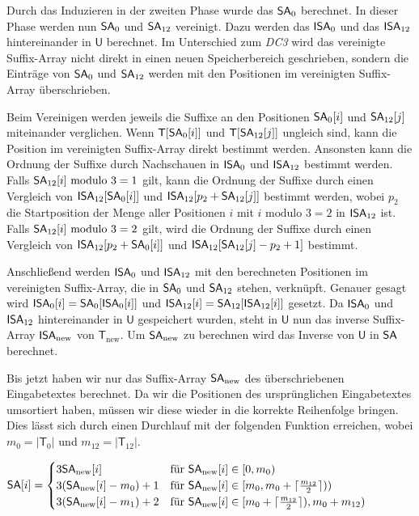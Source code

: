 Durch das Induzieren in der zweiten Phase wurde das $\sa_0$ berechnet. In dieser Phase werden nun $\sa_0$ und $\sa_{12}$ vereinigt. Dazu werden das $\isa_0$ und das $\isa_{12}$ hintereinander in $\mathsf{U}$ berechnet. Im Unterschied zum \emph{DC3} wird das vereinigte Suffix-Array nicht direkt in einen neuen Speicherbereich geschrieben, sondern die Einträge von $\sa_0$ und $\sa_{12}$ werden mit den Positionen im vereinigten Suffix-Array überschrieben. \par
Beim Vereinigen werden jeweils die Suffixe an den Positionen $\sa_0[i]$ und $\sa_{12}[j]$ miteinander verglichen. Wenn $\mathsf{T}[\sa_0[i]]$ und $\mathsf{T}[\sa_{12}[j]]$ ungleich sind, kann die Position im vereinigten Suffix-Array direkt bestimmt werden. Ansonsten kann die Ordnung der Suffixe durch Nachschauen in $\isa_0$ und $\isa_{12}$ bestimmt werden. Falls $\sa_{12}[i] \text{ modulo } 3 = 1$ gilt, kann die Ordnung der Suffixe durch einen Vergleich von $\isa_{12}[\sa_0[i]]$ und $\isa_{12}[p_2+\sa_{12}[j]]$ bestimmt werden, wobei $p_2$ die Startposition der Menge aller Positionen $i$ mit $i \text{ modulo } 3 = 2$ in $\isa_{12}$ ist. Falls $\sa_{12}[i] \text{ modulo } 3 = 2$ gilt, wird die Ordnung der Suffixe durch einen Vergleich von $\isa_{12}[p_2+\sa_0[i]]$ und $\isa_{12}[\sa_{12}[j]-p_2+1]$ bestimmt. \par
Anschließend werden $\isa_0$ und $\isa_{12}$ mit den berechneten Positionen im vereinigten Suffix-Array, die in $\sa_0$ und $\sa_{12}$ stehen, verknüpft. Genauer gesagt wird $\isa_0[i] = \sa_0[\isa_0[i]]$ und $\isa_{12}[i] = \sa_{12}[\isa_{12}[i]]$ gesetzt. Da $\isa_0$ und $\isa_{12}$ hintereinander in $\mathsf{U}$ gespeichert wurden, steht in $\mathsf{U}$ nun das inverse Suffix-Array $\isa_{\text{new}}$ von $\mathsf{T}_{\text{new}}$. Um $\sa_{\text{new}}$ zu berechnen wird das Inverse von $\mathsf{U}$ in $\sa$ berechnet. \par
Bis jetzt haben wir nur das Suffix-Array $\sa_{\text{new}}$ des überschriebenen Eingabetextes berechnet. Da wir die Positionen des ursprünglichen Eingabetextes umsortiert haben, müssen wir diese wieder in die korrekte Reihenfolge bringen. Dies lässt sich durch einen Durchlauf mit der folgenden Funktion erreichen, wobei $m_0 = |\mathsf{T}_0|$ und $m_{12} = |\mathsf{T}_{12}|$. \par
\begin{center}
	$\sa[i] =
   \begin{cases}
     3\sa_{\text{new}}[i] & \text{für } \sa_{\text{new}}[i] \in[0, m_0) \\
     3(\sa_{\text{new}}[i]-m_0)+1 & \text{für } \sa_{\text{new}}[i] \in [m_0 ,m_0+\lceil \frac{m_{12}}{2} \rceil)) \\
     3(\sa_{\text{new}}[i]-m_1)+2 & \text{für } \sa_{\text{new}}[i] \in [m_0+\lceil \frac{m_{12}}{2} \rceil),m_0+m_{12})
   \end{cases}$
\end{center}
